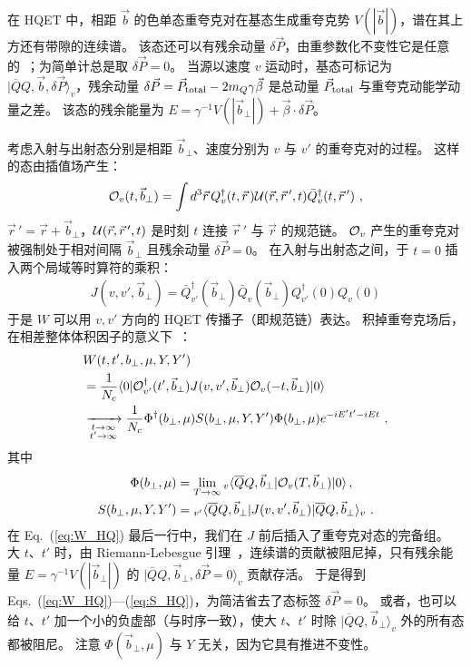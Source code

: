 在 HQET 中，相距 $\vec b$ 的色单态重夸克对在基态生成重夸克势 $V(|\vec b|)$，谱在其上方还有带隙的连续谱。
%
该态还可以有残余动量 $\delta\vec P$，由重参数化不变性它是任意的~\cite{Luke:1992cs,Manohar:2000dt}；为简单计总是取 $\delta\vec P=0$。
%
当源以速度 $v$ 运动时，基态可标记为 $|\overline Q Q,\vec{b},\delta \vec P\rangle_v$，残余动量 $\delta\vec P=\vec{P}_{\rm total}-2m_Q\gamma\vec\beta$ 是总动量 $\vec{P}_{\rm total}$ 与重夸克动能学动量之差。
%
该态的残余能量为 $E=\gamma^{-1}V(|\vec b_{\perp}|)+\vec{\beta}\cdot \delta\vec P$。

考虑入射与出射态分别是相距 ${\vec b}_\perp$、速度分别为 $v$ 与 $v'$ 的重夸克对的过程。
%
这样的态由插值场产生：
\begin{align}
	{\cal O}_v(t,{\vec b}_\perp)=\int d^3\vec r \, Q_v^{\dagger}(t,\vec r\,) {\cal U}(\vec r,\vec r\,',t) \bar Q_v^{\dagger}(t,\vec r\,')  \ ,
\end{align}
$\vec r\,'=\vec r+\vec b_\perp$，${\cal U}(\vec r,\vec r\,',t)$ 是时刻 $t$ 连接 $\vec r\,'$ 与 $\vec r$ 的规范链。
%
${\cal O}_v$ 产生的重夸克对被强制处于相对间隔 $\vec{b}_\perp$ 且残余动量 $\delta \vec P=0$。
%
在入射与出射态之间，于 $t=0$ 插入两个局域等时算符的乘积：
\begin{align}
	J(v,v',\vec{b}_\perp)= \bar Q^\dagger_{v'}(\vec{b}_\perp)\bar Q_v(\vec{b}_\perp)Q_{v'}^\dagger(0)Q_v(0)
\end{align}
%
于是 $W$ 可以用 $v,v'$ 方向的 HQET 传播子（即规范链）表达。
%
积掉重夸克场后，在相差整体体积因子的意义下~\cite{Ji:2019sxk}：
\begin{align}\label{eq:W_HQ}
	&W(t,t',b_\perp,\mu,Y,Y')  \\
	&=\frac{1}{N_c} \langle0|{\cal O}^{\dagger}_{v'}(t',{\vec b}_\perp) J(v,v',\vec{b}_\perp) {\cal O}_v(-t,\vec{b}_\perp)|0\rangle \nonumber\\
	&\xrightarrow[\substack{t\to\infty\\t'\to\infty}]{} \frac{1}{N_c}\Phi^\dagger(b_\perp,\mu) S(b_\perp,\mu,Y,Y') \Phi(b_\perp,\mu)e^{-iE't'-iEt}  \ , \nonumber
\end{align}
其中
\begin{align}\label{eq:S_HQ}
	\Phi(b_\perp,\mu)&=\lim_{T\to\infty}{}_v\langle \overline QQ,\vec{b}_\perp|{\cal O}_v(T,\vec{b}_\perp)|0\rangle\,,\\
	S(b_\perp,\mu,Y,Y')&={{}_{v'}}\langle\overline QQ,\vec{b}_\perp|J(v,v',\vec{b}_\perp)|\overline QQ,\vec{b}_\perp\rangle_v \ . \nonumber
\end{align}
%
在 Eq.~(\ref{eq:W_HQ}) 最后一行中，我们在 $J$ 前后插入了重夸克对态的完备组。
%
大 $t$、$t'$ 时，由 Riemann-Lebesgue 引理~\cite{zuazo2001fourier}，连续谱的贡献被阻尼掉，只有残余能量 $E=\gamma^{-1}V(|\vec b_\perp|)$ 的 $|\overline QQ,\vec{b}_\perp,\delta \vec{P}=0\rangle_v$ 贡献存活。
%
于是得到 Eqs.~(\ref{eq:W_HQ})---(\ref{eq:S_HQ})，为简洁省去了态标签 $\delta \vec{P}=0$。
%
或者，也可以给 $t$、$t'$ 加一个小的负虚部（与时序一致），使大 $t$、$t'$ 时除 $|\overline QQ,\vec{b}_\perp\rangle_v$ 外的所有态都被阻尼。
%
注意 $\Phi(\vec{b}_\perp,\mu)$ 与 $Y$ 无关，因为它具有推进不变性。

